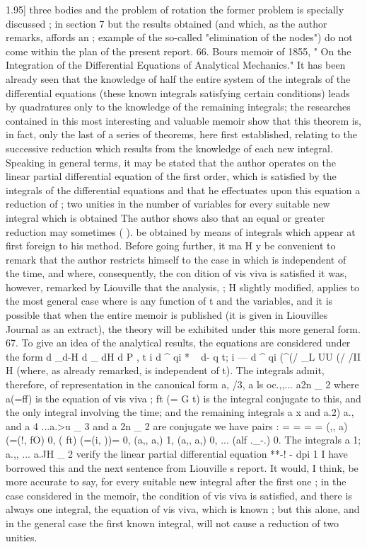 \documentclass[12pt,a4paper]{article}
\theoremstyle{definition}
\begin{document}
1.95]
three bodies and the problem of rotation the former problem is specially discussed
;
in section 7 but the results obtained (and which, as the author remarks, affords an
;
example of the so-called "elimination of the nodes") do not come within the plan of
the present report.
66. Bours memoir of 1855, " On the Integration of the Differential Equations of
Analytical Mechanics." It has been already seen that the knowledge of half the entire
system of the integrals of the differential equations (these known integrals satisfying
certain conditions) leads by quadratures only to the knowledge of the remaining
integrals; the researches contained in this most interesting and valuable memoir show
that this theorem is, in fact, only the last of a series of theorems, here first established,
relating to the successive reduction which results from the knowledge of each new
integral. Speaking in general terms, it may be stated that the author operates on the
linear partial differential equation of the first order, which is satisfied by the integrals
of the differential equations and that he effectuates upon this equation a reduction of
;
two unities in the number of variables for every suitable new integral which is
obtained The author shows also that an equal or greater reduction may sometimes
( ).
be obtained by means of integrals which appear at first foreign to his method. Before
going further, it ma H y be convenient to remark that the author restricts himself to
the case in which is independent of the time, and where, consequently, the con
dition of vis viva is satisfied it was, however, remarked by Liouville that the analysis,
; H
slightly modified, applies to the most general case where is any function of t and
the variables, and it is possible that when the entire memoir is published (it is given
in Liouvilles Journal as an extract), the theory will be exhibited under this more
general form.
67. To give an idea of the analytical results, the equations are considered under
the form
d _d-H d _ dH
d P , t i d ^ qi * ~ d- q t; i --- d ^ qi (^(/ _L UU (/ /II
H
(where, as already remarked, is independent of t). The integrals admit, therefore,
of representation in the canonical form a, /3, a ls oc.,,... a2n _ 2 where a(=ff) is the equation
of vis viva ; ft (= G t) is the integral conjugate to this, and the only integral involving
the time; and the remaining integrals a x and a.2) a., and a 4 ...a.>u _ 3 and a 2n _ 2 are conjugate
we have
pairs :
= = = =
(,, a) (=(!, fO) 0, ( ft) (=(i, ))= 0, (a,, a,) 1, (a,, a,) 0, ... (alf ._-.) 0.
The integrals a 1; a.,, ... a.JH _ 2 verify the linear partial differential equation
**-! -
\dqi dpi
1 I have borrowed this and the next sentence from Liouville s report. It would, I think, be more
accurate to say, for every suitable new integral after the first one ; in the case considered in the memoir,
the condition of vis viva is satisfied, and there is always one integral, the equation of vis viva, which is
known ; but this alone, and in the general case the first known integral, will not cause a reduction of two
unities.
\end{document}
